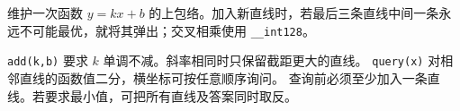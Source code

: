 维护一次函数 $y=kx+b$ 的上包络。加入新直线时，若最后三条直线中间一条永远不可能最优，就将其弹出；交叉相乘使用 \texttt{\_\_int128}。

\texttt{add(k,b)} 要求 $k$ 单调不减。斜率相同时只保留截距更大的直线。
\texttt{query(x)} 对相邻直线的函数值二分，横坐标可按任意顺序询问。
查询前必须至少加入一条直线。若要求最小值，可把所有直线及答案同时取反。
